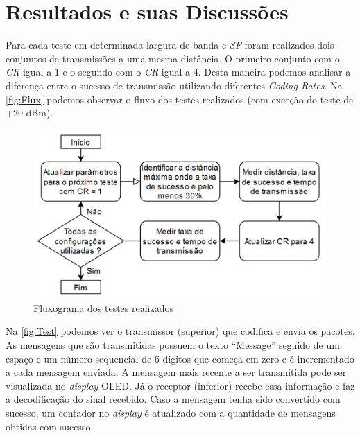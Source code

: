 \documentclass[
	12pt,				%
	openright,			%
	twoside,			%
	a4paper,			%
	english,			%
	french,				%
	spanish,			%
	brazil				%
	]{abntex2}
\newcommand{\quotes}[1]{``#1''}
\begin{document}
\chapter{Resultados e suas Discussões}

Para cada teste em determinada largura de banda e \emph{SF} foram realizados dois conjuntos de transmissões a uma mesma distância. O primeiro conjunto com o \emph{CR} igual a 1 e o segundo com o \emph{CR} igual a 4. Desta maneira podemos analisar a diferença entre o sucesso de transmissão utilizando diferentes \emph{Coding Rates}. Na \autoref{fig:Flux} podemos observar o fluxo dos testes realizados (com exceção do teste de +20 dBm).

\begin{figure}[H]
	\caption{\label{fig:Flux}Fluxograma dos testes realizados}
	\begin{center}
	    \includegraphics[scale=0.5]{img/Flux.png}
	\end{center}
\end{figure}

Na \autoref{fig:Test} podemos ver o transmissor (superior) que codifica e envia os pacotes. As mensagens que são transmitidas possuem o texto \quotes{Message} seguido de um espaço e um número sequencial de 6 dígitos que começa em zero e é incrementado a cada mensagem enviada. A mensagem mais recente a ser transmitida pode ser visualizada no \emph{display} OLED. Já o receptor (inferior) recebe essa informação e faz a decodificação do sinal recebido. Caso a mensagem tenha sido convertido com sucesso, um contador no \emph{display} é atualizado com a quantidade de mensagens obtidas com sucesso.

\newpage
\end{document}
